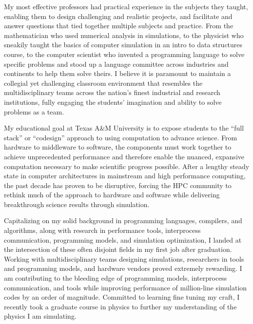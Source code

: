 \documentclass[10pt,letterpaper]{moderncv/moderncv}
\begin{document}
\date{January 20, 2021}
\opening{}
\makelettertitle%
\vspace{-.75cm}

My most effective professors had practical experience in the subjects they taught, enabling them to design challenging and realistic projects, and facilitate and answer questions that tied together multiple subjects and practice.  From the mathematician who used numerical analysis in simulations, to the physicist who sneakily taught the basics of computer simulation in an intro to data structures course, to the computer scientist who invented a programming language to solve specific problems and stood up a language committee across industries and continents to help them solve theirs.  I believe it is paramount to maintain a collegial yet challenging classroom environment that resembles the multidisciplinary teams across the nation's finest industrial and research institutions, fully engaging the students' imagination and ability to solve problems as a team.

My educational goal at Texas A\&M University is to expose students to the ``full stack'' or ``codesign'' approach to using computation to advance science.  From hardware to middleware to software, the components must work together to achieve unprecedented performance and therefore enable the nuanced, expansive computation necessary to make scientific progress possible.  After a lengthy steady state in computer architectures in mainstream and high performance computing, the past decade has proven to be disruptive, forcing the HPC community to rethink much of the approach to hardware and software while delivering breakthrough science results through simulation.

Capitalizing on my solid background in programming languages, compilers, and algorithms, along with research in performance tools, interprocess communication, programming models, and simulation optimization,
I landed at the intersection of these often disjoint fields in my first job after graduation.  Working with multidisciplinary teams designing simulations, researchers in tools and programming models,
and hardware vendors proved extremely rewarding.  I am contributing to the bleeding edge of programming models, interprocess communication, and tools while improving
performance of million-line simulation codes by an order of magnitude.  Committed to learning fine tuning my craft, I recently took a graduate course in physics to further my understanding
of the physics I am simulating.
\end{document}
